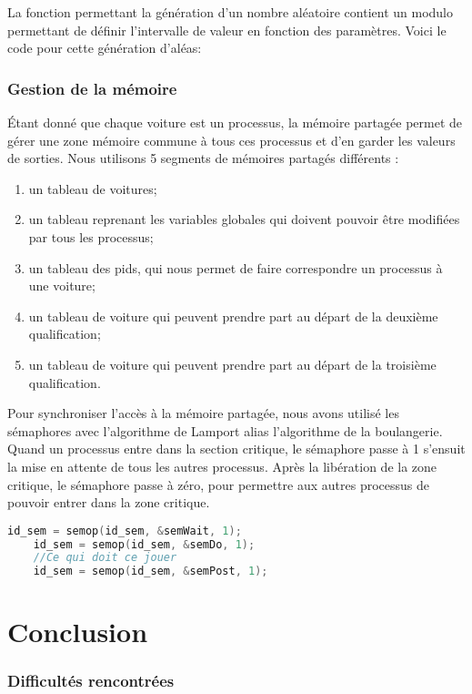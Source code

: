 \documentclass[11pt,a4paper]{article}
\begin{document}
La fonction permettant la génération d'un nombre aléatoire contient un modulo permettant de définir l'intervalle de valeur en fonction des paramètres. Voici le code pour cette génération d'aléas:
 

\section{Gestion de la mémoire}
Étant donné que chaque voiture est un processus, la mémoire partagée permet de gérer une zone mémoire commune à tous ces processus et d'en garder les valeurs de sorties. Nous utilisons 5 segments de mémoires partagés différents :
\begin{enumerate}

\item un tableau de voitures;
\item un tableau reprenant les variables globales qui doivent pouvoir être modifiées par tous les processus;
\item un tableau des pids, qui nous permet de faire correspondre un processus à une voiture;
\item un tableau de voiture qui peuvent prendre part au départ de la deuxième qualification;
\item un tableau de voiture qui peuvent prendre part au départ de la troisième qualification.

\end{enumerate}
\par
Pour synchroniser l'accès à la mémoire partagée, nous avons utilisé les sémaphores avec l'algorithme de Lamport alias l'algorithme de la boulangerie. Quand un processus entre dans la section critique, le sémaphore passe à 1 s'ensuit la mise en attente de tous les autres processus. Après la libération de la zone critique, le sémaphore passe à zéro, pour permettre aux autres processus de pouvoir entrer dans la zone critique.
\begin{lstlisting}[language=c]
	id_sem = semop(id_sem, &semWait, 1);
	id_sem = semop(id_sem, &semDo, 1);
	//Ce qui doit ce jouer 
	id_sem = semop(id_sem, &semPost, 1);
\end{lstlisting}
\newpage
\part{Conclusion}
\section{Difficultés rencontrées}
\end{document}
